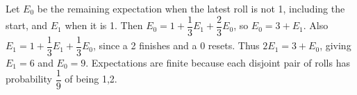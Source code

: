 Let $E_0$ be the remaining expectation when the latest roll is not 1, including the start, and $E_1$ when it is 1. Then $E_0=1+\dfrac{1}{3}E_1+\dfrac{2}{3}E_0$, so $E_0=3+E_1$. Also $E_1=1+\dfrac{1}{3}E_1+\dfrac{1}{3}E_0$, since a 2 finishes and a 0 resets. Thus $2E_1=3+E_0$, giving $E_1=6$ and $\boxed{E_0=9}$. Expectations are finite because each disjoint pair of rolls has probability $\dfrac{1}{9}$ of being 1,2.
